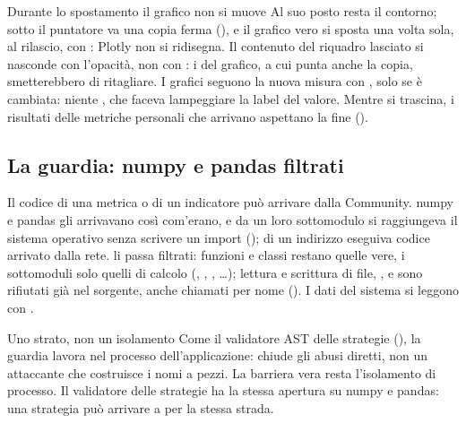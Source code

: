 \begin{attenzione}{Durante lo spostamento il grafico non si muove}
Al suo posto resta il contorno; sotto il puntatore va una copia ferma
(), e il grafico vero si sposta una volta sola, al
rilascio, con : Plotly non si ridisegna. Il contenuto del
riquadro lasciato si nasconde con l'opacità, non con : i
 del grafico, a cui punta anche la copia, smetterebbero di
ritagliare. I grafici seguono la nuova misura con
, solo se è cambiata: niente
, che faceva lampeggiare la label del valore. Mentre si
trascina, i risultati delle metriche personali che arrivano aspettano la fine
().
\end{attenzione}

\subsection{La guardia: numpy e pandas filtrati}

Il codice di una metrica o di un indicatore può arrivare dalla Community.
numpy e pandas gli arrivavano così com'erano, e da un loro sottomodulo si
raggiungeva il sistema operativo senza scrivere un import
();  di un indirizzo
eseguiva codice arrivato dalla rete.  li
passa filtrati: funzioni e classi restano quelle vere, i sottomoduli solo
quelli di calcolo (, , ,
\ldots); lettura e scrittura di file, ,  e 
sono rifiutati già nel sorgente, anche chiamati per nome
(). I dati del sistema si leggono con .

\begin{attenzione}{Uno strato, non un isolamento}
Come il validatore AST delle strategie (),
la guardia lavora nel processo dell'applicazione: chiude gli abusi diretti,
non un attaccante che costruisce i nomi a pezzi. La barriera vera resta
l'isolamento di processo. Il validatore delle strategie ha la stessa
apertura su numpy e pandas: una strategia può arrivare a  per la
stessa strada.
\end{attenzione}
